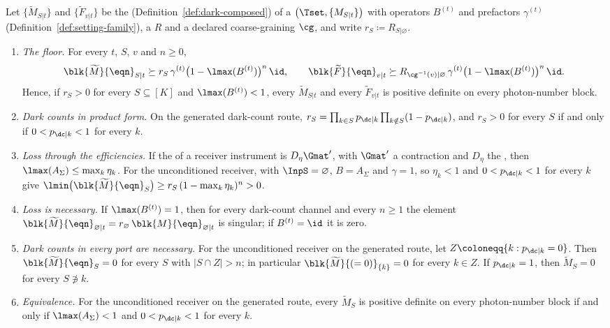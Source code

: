 \begin{proposition}\label{prop:noise-floor}
Let $\{\widetilde M_{S|t}\}$ and $\{\widetilde F_{v|t}\}$ be the
 (Definition~\ref{def:dark-composed}) of a
 $\big(\Tset,\{M_{S|t}\}\big)$ with operators $B^{(t)}$
and prefactors $\gamma^{(t)}$ (Definition~\ref{def:setting-family}), a
 $R$ and a declared coarse-graining $\cg$, and write
$r_S\coloneqq R_{S|\varnothing}$.
\begin{enumerate}[label=(\roman*),leftmargin=3.0em]
\item \emph{The floor.} For every $t$, $S$, $v$ and $n\ge0$,
  \begin{equation}\label{eq:noise-floor}
    \blk{\widetilde M}{\eqn}_{S|t}\succeq r_S\,\gamma^{(t)}
      \big(1-\lmax(B^{(t)})\big)^{n}\,\id,
    \qquad
    \blk{\widetilde F}{\eqn}_{v|t}\succeq R_{\cg^{-1}(v)|\varnothing}\,
      \gamma^{(t)}\big(1-\lmax(B^{(t)})\big)^{n}\,\id .
  \end{equation}
  Hence, if $r_S>0$ for every $S\subseteq[K]$ and $\lmax(B^{(t)})<1$, every
  $\widetilde M_{S|t}$ and every $\widetilde F_{v|t}$ is positive definite on
  every photon-number block.
\item \emph{Dark counts in product form.} On the generated dark-count route,
  $r_S=\prod_{k\in S}p_{\dc|k}\prod_{k\notin S}(1-p_{\dc|k})$, and $r_S>0$
  for every $S$ if and only if $0<p_{\dc|k}<1$ for every $k$.
\item \emph{Loss through the efficiencies.} If the  of a
  receiver instrument is $D_\eta\Gmat'$, with $\Gmat'$ a contraction and
  $D_\eta$ the , then
  $\lmax(A_\Sigma)\le\max_k\eta_k$. For the unconditioned receiver, with
  $\InpS=\varnothing$, $B=A_\Sigma$ and $\gamma=1$, so $\eta_k<1$ and
  $0<p_{\dc|k}<1$ for every $k$ give
  $\lmin\big(\blk{\widetilde M}{\eqn}_S\big)\ge r_S\,(1-\max_k\eta_k)^{n}>0$.
\item \emph{Loss is necessary.} If $\lmax(B^{(t)})=1$, then for every
  dark-count channel and every $n\ge1$ the element
  $\blk{\widetilde M}{\eqn}_{\varnothing|t}=r_\varnothing\,\blk{M}{\eqn}_{\varnothing|t}$
  is singular; if $B^{(t)}=\id$ it is zero.
\item \emph{Dark counts in every port are necessary.} For the unconditioned
  receiver on the generated route, let
  $Z\coloneqq\{k:p_{\dc|k}=0\}$. Then $\blk{\widetilde M}{\eqn}_S=0$ for
  every $S$ with $|S\cap Z|>n$; in particular
  $\blk{\widetilde M}{(=0)}_{\{k\}}=0$ for every $k\in Z$. If $p_{\dc|k}=1$,
  then $\widetilde M_S=0$ for every $S\not\ni k$.
\item \emph{Equivalence.} For the unconditioned receiver on the generated
  route, every $\widetilde M_S$ is positive definite on every
  photon-number block if and only if $\lmax(A_\Sigma)<1$ and
  $0<p_{\dc|k}<1$ for every $k$.
\end{enumerate}
\end{proposition}

